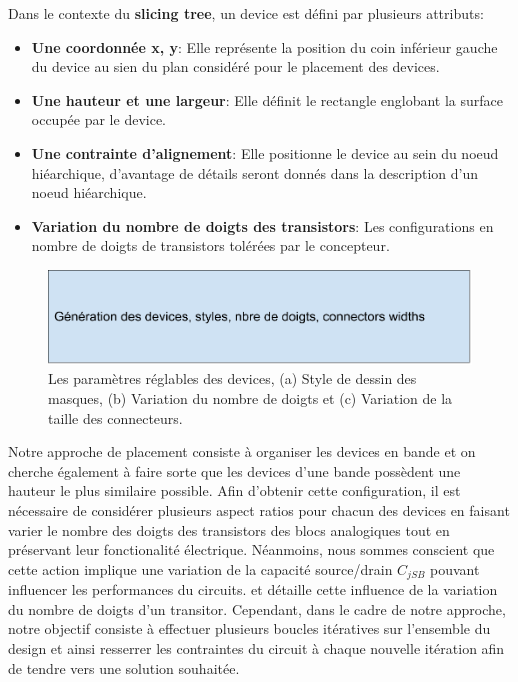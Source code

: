 \indent Dans le contexte du \textbf{slicing tree}, un device est défini par plusieurs attributs:
\begin{itemize}
\item \textbf{Une coordonnée x, y}: Elle représente la position du coin inférieur gauche du device au sien du plan considéré pour le placement des devices.
\item \textbf{Une hauteur et une largeur}: Elle définit le rectangle englobant la surface occupée par le device.
\item \textbf{Une contrainte d'alignement}: Elle positionne le device au sein du noeud hiéarchique, d'avantage de détails seront donnés dans la description d'un noeud hiéarchique. 
\item \textbf{Variation du nombre de doigts des transistors}: Les configurations en nombre de doigts de transistors tolérées par le concepteur.
\end{itemize}

\begin{figure}[h]
\begin{center}
\includegraphics[height=0.11\textheight]{Figures/12.pdf}
\caption{Les paramètres réglables des devices, (a) Style de dessin des masques, (b) Variation du nombre de doigts et (c) Variation de la taille des connecteurs.}
\label{fig:11}
\end{center}
\end{figure} 
Notre approche de placement consiste à organiser les devices en bande et on cherche également à faire sorte que les devices d'une bande possèdent une hauteur le plus similaire possible. Afin d'obtenir cette configuration, il est nécessaire de considérer plusieurs aspect ratios pour chacun des devices en faisant varier le nombre des doigts des transistors des blocs analogiques tout en préservant leur fonctionalité électrique. Néanmoins, nous sommes conscient que cette action implique une variation de la capacité source/drain $C_{jSB}$ pouvant influencer les performances du circuits. \cite{Long2006} et \cite{Wu2014} détaille cette influence de la variation du nombre de doigts d'un transitor. Cependant, dans le cadre de notre approche, notre objectif consiste à effectuer plusieurs boucles itératives sur l'ensemble du design et ainsi resserrer les contraintes du circuit à chaque nouvelle itération afin de tendre vers une solution souhaitée. \newline
 
